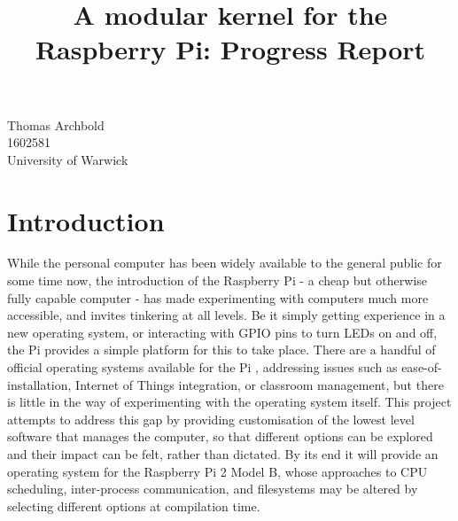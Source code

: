 \documentclass[10pt,a4paper]{article}
\title{A modular kernel for the Raspberry Pi: Progress Report}
\begin{document}
\maketitle

\begin{center}
    Thomas Archbold \\
    1602581 \\
    University of Warwick \\
\end{center}

\section*{Introduction}
While the personal computer has been widely available to the general public for
some time now, the introduction of the Raspberry Pi - a cheap but otherwise
fully capable computer - has made experimenting with computers much more
accessible, and invites tinkering at all levels. Be it simply getting experience
in a new operating system, or interacting with GPIO pins to turn LEDs on and
off, the Pi provides a simple platform for this to take place. There are a
handful of official operating systems available for the Pi \cite{OSes},
addressing issues such as ease-of-installation, Internet of Things integration,
or classroom management, but there is little in the way of experimenting with the
operating system itself. This project attempts to address this gap by providing
customisation of the lowest level software that manages the computer, so that
different options can be explored and their impact can be felt, rather than
dictated. By its end it will provide an operating system for the Raspberry Pi 2
Model B, whose approaches to CPU scheduling, inter-process communication, and
filesystems may be altered by selecting different options at compilation time.
\end{document}
